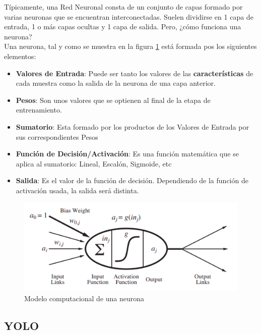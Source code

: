 Típicamente, una Red Neuronal consta de un conjunto de capas formado por varias neuronas que se encuentran interconectadas. Suelen dividirse en 1 capa de entrada, 1 o más capas ocultas y 1 capa de salida. Pero, ¿cómo funciona una neurona?\\

Una neurona, tal y como se muestra en la figura \ref{fig:neurona} está formada pos los siguientes elementos:
\begin{itemize}
	\item \textbf{Valores de Entrada}: Puede ser tanto los valores de las \textbf{características} de cada muestra como la salida de la neurona de una capa anterior.
	\item \textbf{Pesos}: Son unos valores que se optienen al final de la etapa de entrenamiento.
	\item \textbf{Sumatorio}: Esta formado por los productos de los Valores de Entrada por sus correspondientes Pesos
	\item \textbf{Función de Decisión/Activación}: Es una función matemática que se aplica al sumatorio: Lineal, Escalón, Sigmoide, etc
	\item \textbf{Salida}: Es el valor de la función de decisión. Dependiendo de la función de activación usada, la salida será distinta.
\end{itemize}

\begin{figure} [h!]
  \begin{center}
    \includegraphics[width=15cm]{imagenes/neurona.png}
  \end{center}
  \caption[Modelo computacional de una neurona]{Modelo computacional de una neurona \cite{AIMA}}
  \label{fig:neurona}
\end{figure}

\subsection{YOLO}
\label{subsec:yolo}


